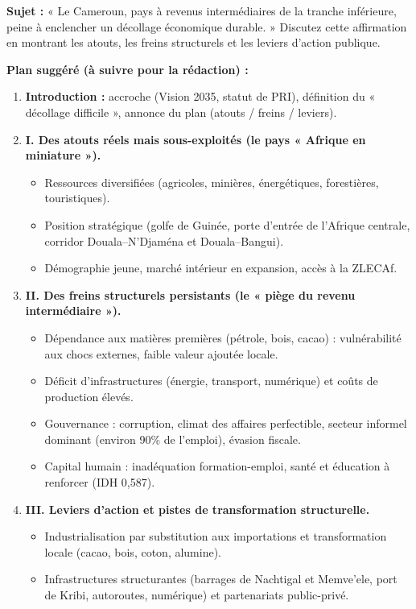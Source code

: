\documentclass[11pt]{article}
\begin{document}
\begin{exercice}
\textbf{Sujet :} « Le Cameroun, pays à revenus intermédiaires de la tranche inférieure, peine à enclencher un décollage économique durable. » Discutez cette affirmation en montrant les atouts, les freins structurels et les leviers d'action publique.

\textbf{Plan suggéré (à suivre pour la rédaction) :}
\begin{enumerate}
\item \textbf{Introduction :} accroche (Vision 2035, statut de PRI), définition du « décollage difficile », annonce du plan (atouts / freins / leviers).
\item \textbf{I. Des atouts réels mais sous-exploités (le pays « Afrique en miniature »).}
\begin{itemize}
\item Ressources diversifiées (agricoles, minières, énergétiques, forestières, touristiques).
\item Position stratégique (golfe de Guinée, porte d'entrée de l'Afrique centrale, corridor Douala--N'Djaména et Douala--Bangui).
\item Démographie jeune, marché intérieur en expansion, accès à la ZLECAf.
\end{itemize}
\item \textbf{II. Des freins structurels persistants (le « piège du revenu intermédiaire »).}
\begin{itemize}
\item Dépendance aux matières premières (pétrole, bois, cacao) : vulnérabilité aux chocs externes, faible valeur ajoutée locale.
\item Déficit d'infrastructures (énergie, transport, numérique) et coûts de production élevés.
\item Gouvernance : corruption, climat des affaires perfectible, secteur informel dominant (environ 90\% de l'emploi), évasion fiscale.
\item Capital humain : inadéquation formation-emploi, santé et éducation à renforcer (IDH 0,587).
\end{itemize}
\item \textbf{III. Leviers d'action et pistes de transformation structurelle.}
\begin{itemize}
\item Industrialisation par substitution aux importations et transformation locale (cacao, bois, coton, alumine).
\item Infrastructures structurantes (barrages de Nachtigal et Memve'ele, port de Kribi, autoroutes, numérique) et partenariats public-privé.

\end{itemize}
\end{enumerate}
\end{exercice}
\end{document}
